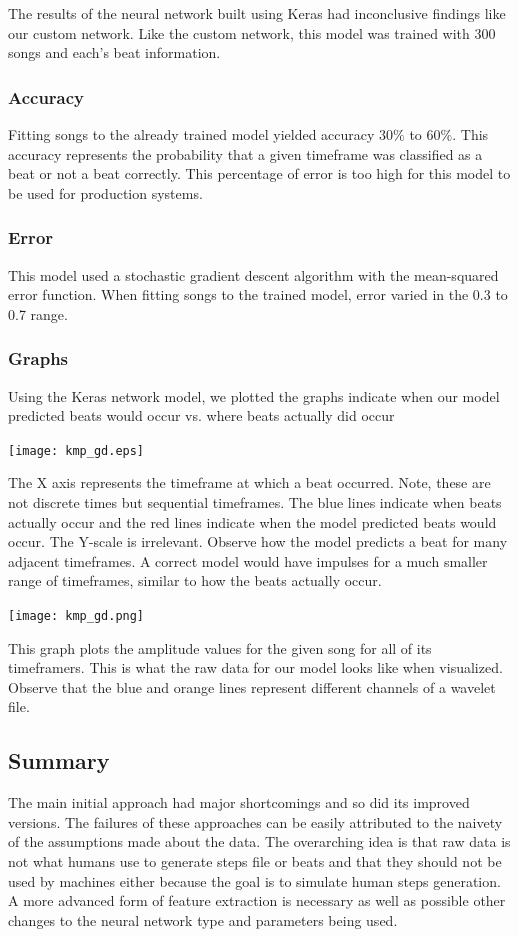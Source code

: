 The results of the neural network built using Keras had inconclusive findings like our custom network. Like the custom network, this model was trained with 300 songs and each's beat information.

\subsubsection{Accuracy}

Fitting songs to the already trained model yielded accuracy $30\%$ to $60\%$. This accuracy represents the probability that a given timeframe was classified as a beat or not a beat correctly. This percentage of error  is too high for this model to be used for production systems.

\subsubsection{Error}

This model used a stochastic gradient descent algorithm with the mean-squared error function. When fitting songs to the trained model, error varied in the 0.3 to 0.7 range. 

\subsubsection{Graphs}

Using the Keras network model, we plotted the graphs indicate when our model predicted beats would occur vs. where beats actually did occur 

\texttt{[image: kmp\_gd.eps]}

The X axis represents the timeframe at which a beat occurred. Note, these are not discrete times but sequential timeframes. The blue lines indicate when beats actually occur and the red lines indicate when the model predicted beats would occur. The Y-scale is irrelevant. Observe how the model predicts a beat for many adjacent timeframes. A correct model would have impulses for a much smaller range of timeframes, similar to how the beats actually occur.

\texttt{[image: kmp\_gd.png]}

This graph plots the amplitude values for the given song for all of its timeframers. This is what the raw data for our model looks like when visualized. Observe that the blue and orange lines represent different channels of a wavelet file.


\subsection{Summary}
The main initial approach had major shortcomings and so did its improved versions. The failures of these approaches can be easily attributed to the naivety of the assumptions made about the data. The overarching idea is that raw data is not what humans use to generate steps file or beats and that they should not be used by machines either because the goal is to simulate human steps generation. A more advanced form of feature extraction is necessary as well as possible other changes to the neural network type and parameters being used.